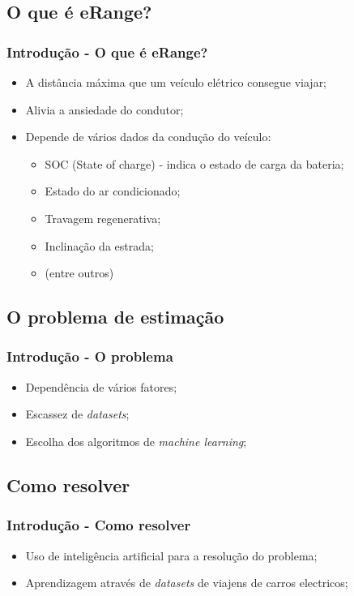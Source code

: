 \documentclass{beamer}
\begin{document}
\subsection[eRange]{O que é eRange?}
\begin{frame}
\frametitle{Introdução - O que é eRange?}

\begin{itemize}
	\item A distância máxima que um veículo elétrico consegue viajar;
	\item Alivia a ansiedade do condutor; 
	\item Depende de vários dados da condução do veículo:
		  \begin{itemize}
			  \item SOC (State of charge) - indica o estado de carga da bateria;
			  \item Estado do ar condicionado;
			  \item Travagem regenerativa;
			  \item Inclinação da estrada;
			  \item (entre outros)
		  \end{itemize}
\end{itemize}


\end{frame}

\subsection[Problema]{O problema de estimação}
\begin{frame}
\frametitle{Introdução - O problema}

\begin{itemize}
	\item Dependência de vários fatores;
	\item Escassez de \textit{datasets};
	\item Escolha dos algoritmos de \textit{machine learning};
\end{itemize}

\end{frame}

\subsection[Como resolver]{Como resolver}
\begin{frame}
\frametitle{Introdução - Como resolver}

\begin{itemize}
	\item Uso de inteligência artificial para a resolução do problema;
	\item Aprendizagem através de \textit{datasets} de viajens de carros electricos;
\end{itemize}

\end{frame}
\end{document}
